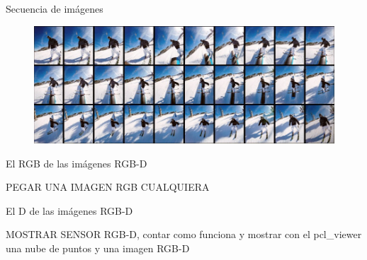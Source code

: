 \documentclass[]{beamer}
\begin{document}
\begin{frame}{Secuencia de imágenes}
    \begin{figure}[t]
        \centering
        \includegraphics[scale=0.35]{img/rafaga_1.jpg}
    \end{figure}
\end{frame}



\begin{frame}{El RGB de las imágenes RGB-D}
    \begin{block}{}
        PEGAR UNA IMAGEN RGB CUALQUIERA
    \end{block}
\end{frame}

\begin{frame}{El D de las imágenes RGB-D}
    \begin{block}{}
        MOSTRAR SENSOR RGB-D, contar como funciona y mostrar con el pcl\_viewer una nube de puntos y una imagen RGB-D
    \end{block}
\end{frame}
\end{document}
